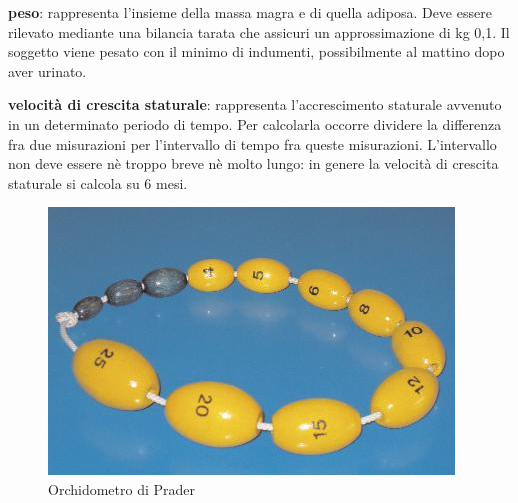 \textbf{peso}: rappresenta l'insieme della massa magra e di quella adiposa. Deve essere rilevato mediante una bilancia tarata che assicuri un approssimazione di kg 0,1. Il soggetto viene pesato con il minimo di indumenti, possibilmente al mattino dopo aver urinato.


\textbf{velocità di crescita staturale}: rappresenta l'accrescimento staturale avvenuto in un determinato periodo di tempo. Per calcolarla occorre dividere la differenza fra due misurazioni per l'intervallo di tempo fra queste misurazioni. L'intervallo non deve essere nè troppo breve nè molto lungo: in genere la velocità di crescita staturale si calcola su 6 mesi.




\begin{figure}[h]
  \begin{center}
	\includegraphics[scale=0.75]{grafici/orchidometro.jpg}
  \end{center}
  \caption{Orchidometro di Prader}
\end{figure}

